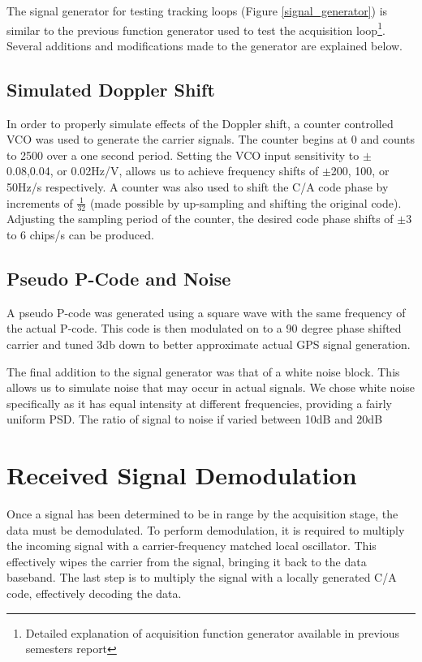 \documentclass[11pt]{article}
\numberwithin{equation}{subsection}
\begin{document}
	The signal generator for testing tracking loops (Figure \ref{signal_generator}) is similar to the previous function generator used to test the acquisition loop\footnote{Detailed explanation of acquisition function generator available in previous semesters report}. Several additions and modifications made to the generator are explained below.
	
	\subsection{Simulated Doppler Shift}
	
	In order to properly simulate effects of the Doppler shift, a counter controlled VCO was used to generate the carrier signals. The counter begins at 0 and counts to 2500 over a one second period. Setting the VCO input sensitivity to $\pm$0.08,0.04, or 0.02Hz/V, allows us to achieve frequency shifts of $\pm$200, 100, or 50Hz/s respectively. A counter was also used to shift the C/A code phase by increments of $\frac{1}{32}$ (made possible by up-sampling and shifting the original code). Adjusting the sampling period of the counter, the desired code phase shifts of $\pm$3 to 6 chips/s can be produced.
	
	\subsection{Pseudo P-Code and Noise}
	
	A pseudo P-code was generated using a square wave with the same frequency of the actual P-code. This code is then modulated on to a 90 degree phase shifted carrier and tuned 3db down to better approximate actual GPS signal generation.
	
	The final addition to the signal generator was that of a white noise block. This allows  us to simulate noise that may occur in actual signals. We chose white noise specifically as it has equal intensity at different frequencies, providing a fairly uniform PSD. The ratio of signal to noise if varied between 10dB and 20dB 
	
	\section{Received Signal Demodulation}
	
	Once a signal has been determined to be in range by the acquisition stage, the data must be demodulated. To perform demodulation, it is required to multiply the incoming signal with a carrier-frequency matched local oscillator. This effectively wipes the carrier from the signal, bringing it back to the data baseband. The last step is to multiply the signal with a locally generated C/A code, effectively decoding the data.
	
\end{document}

